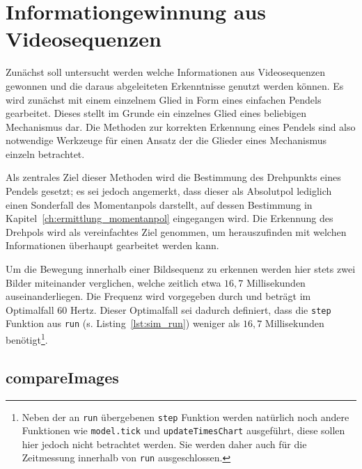 
\chapter{Informationgewinnung aus Videosequenzen}\label{ch:infoerhalt_aus_abgleich_bilder}


Zunächst soll untersucht werden welche Informationen aus Videosequenzen gewonnen und die daraus abgeleiteten Erkenntnisse genutzt werden können.
Es wird zunächst mit einem einzelnem Glied in Form eines einfachen Pendels gearbeitet.
Dieses stellt im Grunde ein einzelnes Glied eines beliebigen Mechanismus dar.
Die Methoden zur korrekten Erkennung eines Pendels sind also notwendige Werkzeuge für einen Ansatz der die Glieder eines Mechanismus einzeln betrachtet.

Als zentrales Ziel dieser Methoden wird die Bestimmung des Drehpunkts eines Pendels gesetzt; es sei jedoch angemerkt, dass dieser als Absolutpol lediglich einen Sonderfall des Momentanpols darstellt, auf dessen Bestimmung in Kapitel~\ref{ch:ermittlung_momentanpol} eingegangen wird.
Die Erkennung des Drehpols wird als vereinfachtes Ziel genommen, um herauszufinden mit welchen Informationen überhaupt gearbeitet werden kann.

Um die Bewegung innerhalb einer Bildsequenz zu erkennen werden hier stets zwei Bilder miteinander verglichen, welche zeitlich etwa $16,7$ Millisekunden auseinanderliegen.
Die Frequenz wird vorgegeben durch  und beträgt im Optimalfall 60 Hertz.
Dieser Optimalfall sei dadurch definiert, dass die \lstinline{step} Funktion aus \lstinline{run} (s. Listing~\ref{lst:sim_run}) weniger als $16,7$ Millisekunden benötigt\footnote{Neben der an \lstinline{run} übergebenen \lstinline{step} Funktion werden natürlich noch andere Funktionen wie \lstinline{model.tick} und \lstinline{updateTimesChart} ausgeführt, diese sollen hier jedoch nicht betrachtet werden. Sie werden daher auch für die Zeitmessung innerhalb von \lstinline{run} ausgeschlossen.}.

\section{compareImages}

